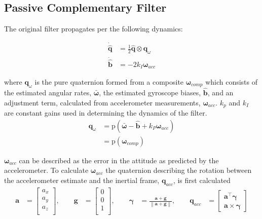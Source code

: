 \documentclass[paper=a4, fontsize=11pt]{scrartcl} %
\numberwithin{equation}{section} %
\numberwithin{figure}{section} %
\numberwithin{table}{section} %
\begin{document}
\subsection{Passive Complementary Filter}
The original filter propagates per the following dynamics:

\newcommand{\wacc}{\bm{\omega}_{acc}}
\begin{equation}
	\begin{aligned}
	\bm{\dot{\hat{q}}} &= \frac{1}{2} \bm{\hat{q}} \otimes \bm{q}_{\omega}\\
	\bm{\dot{\hat{b}}} &= -2k_I\wacc
	\end{aligned}
	\label{eq:traditional_prop}
\end{equation}


where $\bm{q}_{\omega}$ is the pure quaternion formed from a composite $\bm{\omega}_{comp}$ which consists of the estimated angular rates, $\bar{\bm{\omega}}$, the estimated gyroscope biases, $\hat{\bm{b}}$, and an adjustment term, calculated from accelerometer measurements, $\bm{\omega}_{acc}$. $k_p$ and $k_I$ are constant gains used in determining the dynamics of the filter.
\begin{equation}
\begin{aligned}
	\bm{q}_{\omega} &= \textrm{p}\left(\bar{\bm{\omega}} - \hat{\bm{b}} + k_P\wacc\right) \\
	&= \textrm{p}\left( \bm{\omega}_{comp} \right) 
	\label{eq:q_omega}
\end{aligned}
\end{equation}

\newcommand{\avec}{\bm{a}}
\newcommand{\gvec}{\bm{g}}
\newcommand{\qmeas}{\bm{q}_{acc}}
\newcommand{\gamvec}{\bm{\gamma}}
\newcommand{\norm}[1]{\left\lVert#1\right\rVert}
\newcommand{\wbar}{\bm{\bar{\omega}}}
\newcommand{\w}{\bm{\omega}}
\newcommand{\qhat}{\hat{\bm{q}}}

$\wacc$ can be described as the error in the attitude as predicted by the accelerometer.  To calculate $\wacc$ the quaternion describing the rotation between the accelerometer estimate and the inertial frame, $\qmeas$, is first calculated
\begin{equation}
\begin{aligned}
	\avec &= 
		\begin{bmatrix}
			a_x \\
			a_y \\
			a_z \\
			\end{bmatrix},
	\qquad
	\gvec &=
	  \begin{bmatrix}
			0 \\
			0 \\
			1 \\
		\end{bmatrix}, \qquad
	\gamvec &= \frac{\avec+\gvec}{\norm{\avec+\gvec}}, \qquad
	\qmeas &=
	  \begin{bmatrix}
	    \avec^\top \gamvec \\
	    \avec \times \gamvec
	  \end{bmatrix}
\end{aligned}
\end{equation}
\end{document}

